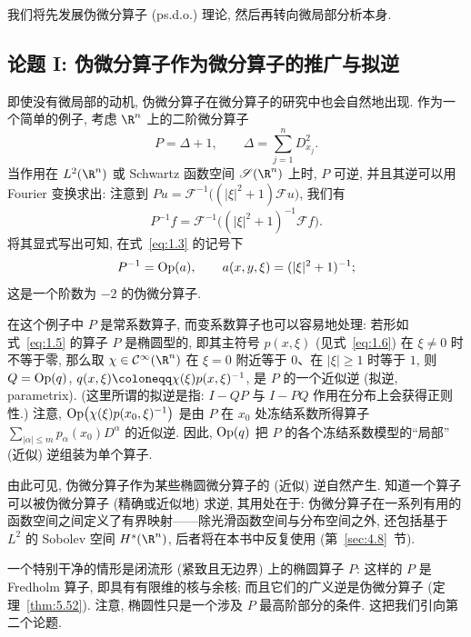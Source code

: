 我们将先发展伪微分算子 (ps.d.o.) 理论, 然后再转向微局部分析本身.

\subsection*{论题 I: 伪微分算子作为微分算子的推广与拟逆}
即使没有微局部的动机, 伪微分算子在微分算子的研究中也会自然地出现. 作为一个简单的例子, 考虑 $\R^n$ 上的二阶微分算子
\begin{equation}\label{eq:1.9}
    P = \Delta + 1, \qquad \Delta = \sum_{j=1}^n D_{x_j}^2.
\end{equation}
当作用在 $L^2(\R^n)$ 或 Schwartz 函数空间 $\Schwartz(\R^n)$ 上时, $P$ 可逆, 并且其逆可以用 Fourier 变换求出: 注意到 $P u = \mathcal{F}^{-1}\bigl((|\xi|^2 + 1) \mathcal{F} u\bigr)$, 我们有
\begin{equation}\label{eq:1.10}
    P^{-1} f = \mathcal{F}^{-1}\bigl((|\xi|^2 + 1)^{-1} \mathcal{F} f\bigr).
\end{equation}
将其显式写出可知, 在式~\eqref{eq:1.3} 的记号下
\begin{equation}\label{eq:1.11}
    P^{-1} = \operatorname{Op}(a), \qquad a(x, y, \xi) = (|\xi|^2 + 1)^{-1};
\end{equation}
这是一个阶数为 $-2$ 的伪微分算子.

在这个例子中 $P$ 是常系数算子, 而变系数算子也可以容易地处理: 若形如式~\eqref{eq:1.5} 的算子 $P$ 是椭圆型的, 即其主符号 $p(x, \xi)$ (见式~\eqref{eq:1.6}) 在 $\xi \neq 0$ 时不等于零, 那么取 $\chi \in \Smooth(\R^n)$ 在 $\xi = 0$ 附近等于 $0$、在 $|\xi| \ge 1$ 时等于 $1$, 则 $Q = \operatorname{Op}(q)$, $q(x, \xi) \defeq \chi(\xi) p(x, \xi)^{-1}$, 是 $P$ 的一个近似逆 (拟逆, parametrix). (这里所谓的拟逆是指: $I - Q P$ 与 $I - P Q$ 作用在分布上会获得正则性.) 注意, $\operatorname{Op}\bigl(\chi(\xi) p(x_0, \xi)^{-1}\bigr)$ 是由 $P$ 在 $x_0$ 处冻结系数所得算子 $\sum_{|\alpha| \le m} p_\alpha(x_0) D^\alpha$ 的近似逆. 因此, $\operatorname{Op}(q)$ 把 $P$ 的各个冻结系数模型的``局部'' (近似) 逆组装为单个算子.

由此可见, 伪微分算子作为某些椭圆微分算子的 (近似) 逆自然产生. 知道一个算子可以被伪微分算子 (精确或近似地) 求逆, 其用处在于: 伪微分算子在一系列有用的函数空间之间定义了有界映射——除光滑函数空间与分布空间之外, 还包括基于 $L^2$ 的 Sobolev 空间 $H^s(\R^n)$, 后者将在本书中反复使用 (第~\ref{sec:4.8}~节).

一个特别干净的情形是闭流形 (紧致且无边界) 上的椭圆算子 $P$: 这样的 $P$ 是 Fredholm 算子, 即具有有限维的核与余核; 而且它们的广义逆是伪微分算子 (定理~\ref{thm:5.52}). 注意, 椭圆性只是一个涉及 $P$ 最高阶部分的条件. 这把我们引向第二个论题.

